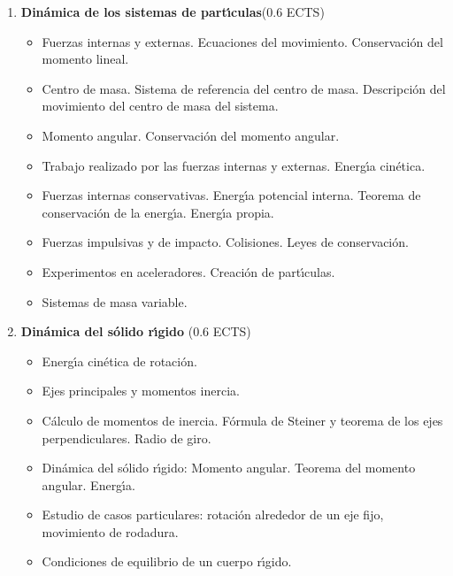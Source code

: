 \begin{enumerate}[{\bf 1. }]
\item {\bf Din\'{a}mica de los sistemas de part\'{\i}culas}\hfill  (0.6 ECTS)
\begin{itemize} \addtolength{\itemsep}{-0.25\baselineskip}
\noindent
\item Fuerzas internas y externas. Ecuaciones del movimiento. Conservaci\'{o}n del momento lineal.
\item Centro de masa. Sistema de referencia del centro de masa.
 Descripci\'{o}n del movimiento  del centro de masa del sistema.
\item Momento angular. Conservaci\'{o}n del momento angular.
\item Trabajo realizado por las fuerzas internas y externas. Energ\'{\i}a
 cin\'{e}tica.
\item Fuerzas internas conservativas. Energ\'{\i}a potencial interna. 
Teorema de conservaci\'{o}n de la energ\'{\i}a. Energ\'{\i}a propia.
\item Fuerzas impulsivas y de impacto. Colisiones. Leyes de conservaci\'{o}n.
\item Experimentos en aceleradores. Creaci\'{o}n de part\'{\i}culas.
\item Sistemas de masa variable.
\end{itemize}
%

\item {\bf  Din\'{a}mica del s\'{o}lido r\'{\i}gido} \hfill (0.6 ECTS)
\begin{itemize} \addtolength{\itemsep}{-0.25\baselineskip}
\noindent
\item Energ\'{\i}a cin\'{e}tica de rotaci\'{o}n.
\item Ejes principales y momentos inercia.
\item C\'{a}lculo de momentos de inercia. F\'{o}rmula de Steiner y teorema de los ejes perpendiculares. Radio de giro.
\item Din\'{a}mica del s\'{o}lido r\'{\i}gido: Momento angular. Teorema del momento angular. Energ\'{\i}a. 
\item Estudio de casos particulares: rotaci\'{o}n alrededor de un eje fijo, 
movimiento de rodadura.
\item Condiciones de equilibrio de un cuerpo r\'{\i}gido.
\end{itemize}
%


\end{enumerate}
